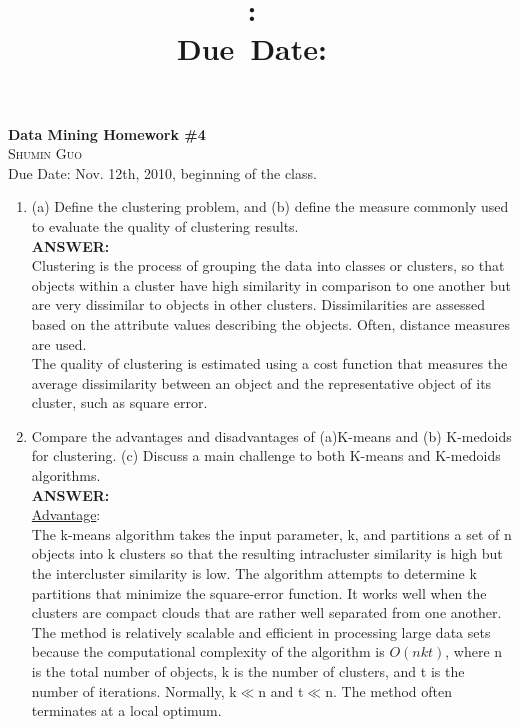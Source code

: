 \documentclass{article}
\title{\textbf{\hmwkClass:\ 
      \hmwkTitle}\\\normalsize\small{Due\ Date:\
    \hmwkDueDate}}
\author{\textbf{\hmwkAuthorName}}
\begin{document}
\begin{center}
\textbf{\textup{\LARGE Data Mining  Homework \#4}} \\
\textsc{Shumin Guo} \\
\small{Due Date: Nov. 12th, 2010, beginning of the class.}
\end{center}

\begin{enumerate}
\item (a) Define the clustering problem, and (b) define the measure
  commonly used to evaluate the quality of clustering results. \\
\textbf{ANSWER:}\\ 
Clustering is the process of grouping the data into classes or
clusters, so that objects within a cluster have high similarity in
comparison to one another but are very dissimilar to objects in other
clusters. Dissimilarities are assessed based on the attribute values
describing the objects. Often, distance measures are used.\\
The quality of clustering is estimated using a cost function that
measures the average dissimilarity between an object and the
representative object of its cluster, such as square error.

\item Compare the advantages and disadvantages of (a)K-means and (b)
  K-medoids for clustering. (c) Discuss a main challenge to both
  K-means and K-medoids algorithms.\\
\textbf{ANSWER:} \\
\underline{Advantage}:\\
The k-means algorithm takes the input parameter, k, and partitions a
set of n objects into k clusters so that the resulting intracluster
similarity is high but the intercluster similarity is low. The
algorithm attempts to determine k partitions that minimize the
square-error function. It works well when the clusters are compact
clouds that are rather well separated from one another. The method is
relatively scalable and efficient in processing large data sets
because the computational complexity of the algorithm is $O(nkt)$, where
n is the total number of objects, k is the number of clusters, and t
is the number of iterations. Normally, k$\ll$n and t$\ll$n. The method often
terminates at a local optimum. 


\end{enumerate}
\end{document}
